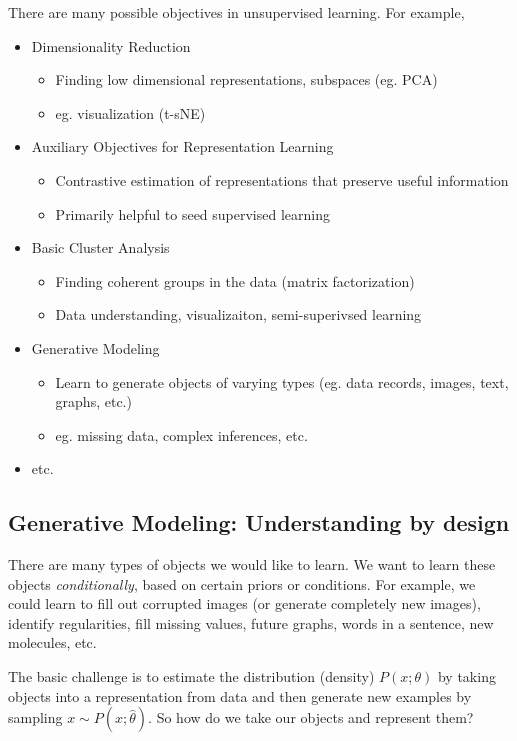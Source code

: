 \documentclass[11pt]{scrartcl}
\begin{document}
There are many possible objectives in unsupervised learning. For example, 
\begin{itemize}
    \item Dimensionality Reduction
    \begin{itemize}
        \item Finding low dimensional representations, subspaces (eg. PCA)
        \item eg. visualization (t-sNE)
    \end{itemize}
    \item Auxiliary Objectives for Representation Learning
    \begin{itemize}
        \item Contrastive estimation of representations that preserve useful information
        \item Primarily helpful to seed supervised learning
    \end{itemize}
    \item Basic Cluster Analysis
    \begin{itemize}
        \item Finding coherent groups in the data (matrix factorization)
        \item Data understanding, visualizaiton, semi-superivsed learning
    \end{itemize}
    \item Generative Modeling
    \begin{itemize}
        \item Learn to generate objects of varying types (eg. data records, images, text, graphs, etc.)
        \item eg. missing data, complex inferences, etc.
    \end{itemize}
    \item etc.
\end{itemize}

\subsection{Generative Modeling: Understanding by design}
There are many types of objects we would like to learn. We want to learn these objects \textit{conditionally}, based on certain priors or conditions. For example, we could learn to fill out corrupted images (or generate completely new images), identify regularities, fill missing values, future graphs, words in a sentence, new molecules, etc.  

The basic challenge is to estimate the distribution (density) $P(x;\theta)$ by taking objects into a representation from data and then generate new examples by sampling $x \sim P(x;\hat{\theta})$. So how do we take our objects and represent them? 
\end{document}
